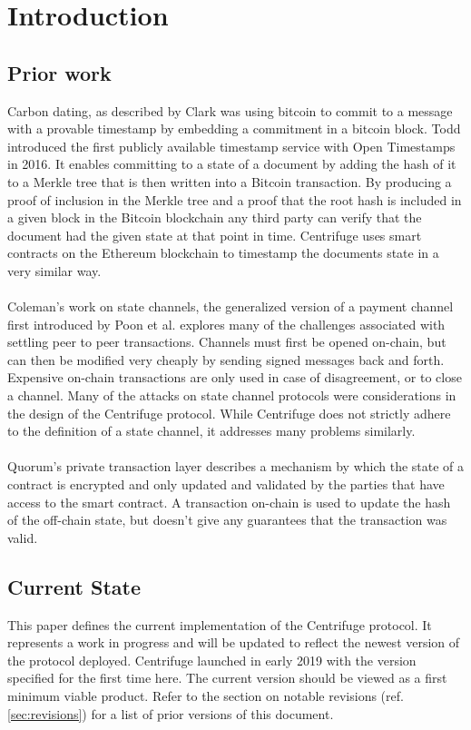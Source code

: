 \section{Introduction}
\subsection{Prior work}
Carbon dating, as described by Clark\cite{clark2012commitcoin} was using bitcoin to commit to a message with a provable timestamp by embedding a commitment in a bitcoin block. Todd\cite{todd2016opentimestamps} introduced the first publicly available timestamp service with Open Timestamps in 2016. It enables committing to a state of a document by adding the hash of it to a Merkle tree that is then written into a Bitcoin transaction. By producing a proof of inclusion in the Merkle tree and a proof that the root hash is included in a given block in the Bitcoin blockchain any third party can verify that the document had the given state at that point in time. Centrifuge uses smart contracts on the Ethereum blockchain to timestamp the documents state in a very similar way.
\\\\
Coleman's work on state channels\cite{coleman2018counterfactual}, the generalized version of a payment channel first introduced by Poon et al.\cite{poon2016lightningnetwork} explores many of the challenges associated with settling peer to peer transactions. Channels must first be opened on-chain, but can then be modified very cheaply by sending signed messages back and forth. Expensive on-chain transactions are only used in case of disagreement, or to close a channel. Many of the attacks on state channel protocols were considerations in the design of the Centrifuge protocol. While Centrifuge does not strictly adhere to the definition of a state channel, it addresses many problems similarly.
\\\\
Quorum's private transaction layer\cite{quorumprivatetransactionwiki} describes a mechanism by which the state of a contract is encrypted and only updated and validated by the parties that have access to the smart contract. A transaction on-chain is used to update the hash of the off-chain state, but doesn't give any guarantees that the transaction was valid.
\subsection{Current State}
This paper defines the current implementation of the Centrifuge protocol. It represents a work in progress and will be updated to reflect the newest version of the protocol deployed. Centrifuge launched in early 2019 with the version specified for the first time here. The current version should be viewed as a first minimum viable product. Refer to the section on notable revisions (ref. \ref{sec:revisions}) for a list of prior versions of this document.
